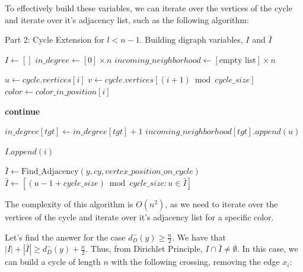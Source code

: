 To effectively build these variables, we can iterate over the vertices of the cycle and iterate over it's adjacency list,
such as the following algorithm:

\begin{algorithm}[H]
    \caption{Part 2: Cycle Extension for \( l < n - 1 \). Building digraph variables, $I$ and $\bar{I}$}
    \begin{algorithmic}[1]
            \State $I \gets []$
            \State $in\_degree \gets [0] \times n$
            \State $incoming\_neighborhood \gets [\text{empty list}] \times n$
            
                \State $u \gets cycle.vertices[i]$
                \State $v \gets cycle.vertices[(i + 1) \bmod cycle\_size]$
                \State $color \gets color\_in\_position[i]$
                
                        \State \textbf{continue}
                    \EndIf
                    
                    \State $in\_degree[tgt] \gets in\_degree[tgt] + 1$
                    \State $incoming\_neighborhood[tgt].append(u)$
                    
                        \State $I.append(i)$
                    \EndIf
                \EndFor
            \EndFor
            
            \State $\bar{I} \gets \text{Find\_Adjacency}(y, cy, vertex\_position\_on\_cycle)$
            \State $\bar{I} \gets [(u - 1 + cycle\_size) \bmod cycle\_size : u \in \bar{I}]$

        \EndFunction
    \end{algorithmic}
\end{algorithm}

The complexity of this algorithm is $O(n^2)$, as we need to iterate over the vertices of the cycle and iterate over 
it's adjacency list for a specific color. 

Let's find the answer for the case $d^-_D(y) \geq \frac{n}{2}$. We have that 
$|I| + |\bar{I}|  \geq d^-_D(y) +  \frac{n}{2} $. 
Thus, from Dirichlet Principle, $I \cap \bar{I} \neq \emptyset$. In this case, we can build 
a cycle of length $n$ with the following crossing, removing the edge $x_i$:

